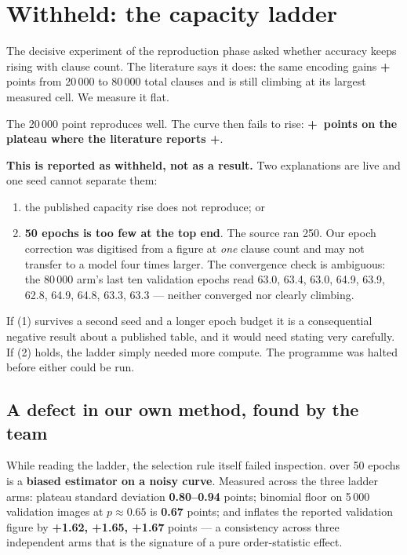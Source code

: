 \section{Withheld: the capacity ladder}
\label{sec:withheld}

The decisive experiment of the reproduction phase asked whether accuracy keeps rising with clause
count. The literature says it does: the same encoding gains \textbf{+\LadderRisePub} points from
20\,000 to 80\,000 total clauses and is still climbing at its largest measured cell. We measure it
flat.


The 20\,000 point reproduces well. The curve then fails to rise: \textbf{+\LadderRise\ points on the
plateau where the literature reports +\LadderRisePub}.

\textbf{This is reported as withheld, not as a result.} Two explanations are live and one seed cannot
separate them:
\begin{enumerate}
\item the published capacity rise does not reproduce; or
\item \textbf{50 epochs is too few at the top end}. The source ran 250. Our epoch correction was
      digitised from a figure at \emph{one} clause count and may not transfer to a model four times
      larger. The convergence check is ambiguous: the 80\,000 arm's last ten validation epochs read
      63.0, 63.4, 63.0, 64.9, 63.9, 62.8, 64.9, 64.8, 63.3, 63.3 --- neither converged nor clearly
      climbing.
\end{enumerate}

If (1) survives a second seed and a longer epoch budget it is a consequential negative result about a
published table, and it would need stating very carefully. If (2) holds, the ladder simply needed more
compute. The programme was halted before either could be run.

\subsection{A defect in our own method, found by the team}
While reading the ladder, the selection rule itself failed inspection.  over 50 epochs is a \textbf{biased estimator on a noisy curve}. Measured across the
three ladder arms: plateau standard deviation \textbf{0.80--0.94} points; binomial floor on 5\,000
validation images at $p\approx0.65$ is \textbf{0.67} points; and  inflates the reported
validation figure by \textbf{+1.62, +1.65, +1.67} points --- a consistency across three independent
arms that is the signature of a pure order-statistic effect.

